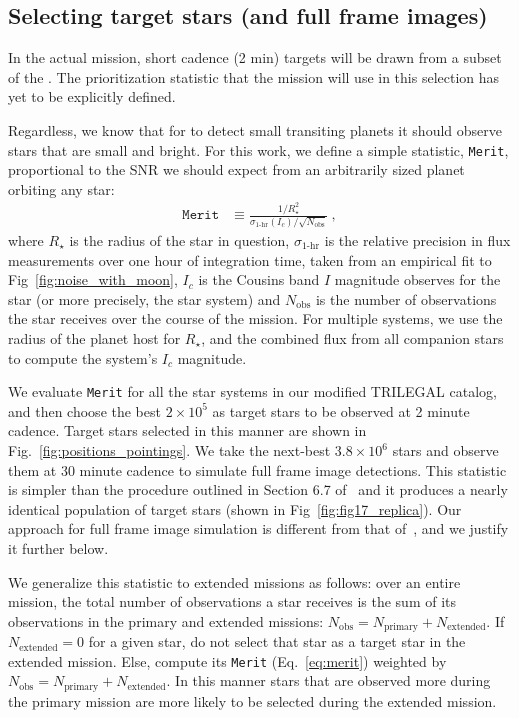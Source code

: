 \subsection{Selecting target stars (and full frame images)}
\label{sec:selection_criteria}
In the actual mission, \tesss short cadence (2 min) targets will be drawn from a subset of the \tic. 
The prioritization statistic that the mission will use in this selection has yet to be explicitly defined.

Regardless, we know that for \tess to detect small transiting planets it should observe stars that are small and bright.
For this work, we define a simple statistic, \texttt{Merit}, proportional to the SNR we should expect from an arbitrarily sized planet orbiting any star:
\begin{align}
\texttt{Merit} &\equiv 
	\frac{1/R_\star^2}{\sigma_\text{1-hr}(I_c)/\sqrt{N_\text{obs}}}\ ,
\label{eq:merit}
\end{align}
where $R_\star$ is the radius of the star in question, $\sigma_\text{1-hr}$ is the relative precision in flux measurements over one hour of integration time, taken from an empirical fit to Fig~\ref{fig:noise_with_moon}, $I_c$ is the Cousins band $I$ magnitude \tess observes for the star (or more precisely, the star system) and $N_\text{obs}$ is the number of observations the star receives over the course of the mission.
For multiple systems, we use the radius of the planet host for $R_\star$, and the combined flux from all companion stars to compute the system's $I_c$ magnitude.

We evaluate \texttt{Merit} for all the star systems in our modified TRILEGAL catalog, and then choose the best $2\times10^5$ as target stars to be observed at 2 minute cadence.
Target stars selected in this manner are shown in Fig.~\ref{fig:positions_pointings}.
We take the next-best $3.8\times10^6$ stars and observe them at 30 minute cadence to simulate full frame image detections.
This statistic is simpler than the procedure outlined in Section 6.7 of~ and it produces a nearly identical population of target stars (shown in Fig~\ref{fig:fig17_replica}).
Our approach for full frame image simulation is different from that of~, and we justify it further below.

We generalize this statistic to extended missions as follows:
over an entire mission, the total number of observations a star receives is the sum of its observations in the primary and extended missions: $N_\text{obs}=N_\text{primary}+N_\text{extended}$.
If $N_\text{extended}=0$ for a given star, do not select that star as a target star in the extended mission.
Else, compute its \texttt{Merit} (Eq.~\ref{eq:merit}) weighted by $N_\text{obs}=N_\text{primary}+N_\text{extended}$.
In this manner stars that are observed more during the primary mission are more likely to be selected during the extended mission.
 
